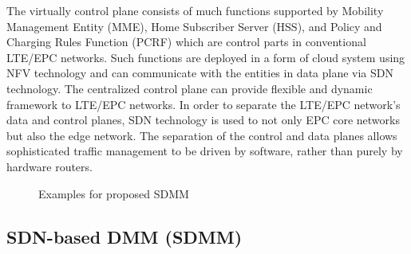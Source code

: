 \documentclass[runningheads,a4paper]{llncs}
\begin{document}
The virtually control plane consists of much functions supported by Mobility Management Entity (MME), Home Subscriber Server (HSS), and Policy and Charging Rules Function (PCRF) which are control parts in conventional LTE/EPC networks. Such functions are deployed in a form of cloud system using NFV technology and can communicate with the entities in data plane via SDN technology. The centralized control plane can provide flexible and dynamic framework to LTE/EPC networks. In order to separate the LTE/EPC network's data and control planes, SDN technology is used to not only EPC core networks but also the edge network. The separation of the control and data planes allows sophisticated traffic management to be driven by software, rather than purely by hardware routers.

\begin{figure}[t] 
\centering 
{}
\caption{Examples for proposed SDMM}
\label{fig:2}
\end{figure}

\subsection{SDN-based DMM (SDMM)}
\end{document}
